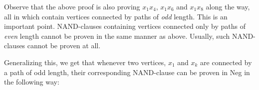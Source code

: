 Observe that the above proof is also proving $x_1x_4$, $x_1x_6$ and $x_1x_8$ along the way, all in which contain vertices connected by paths of \textit{odd} length.
This is an important point.
NAND-clauses containing vertices connected only by paths of \textit{even} length cannot be proven in the same manner as above.
Usually, such NAND-clauses cannot be proven at all.

Generalizing this, we get that whenever two vertices, $x_1$ and $x_k$ are connected by a path of odd length, their corresponding NAND-clause can be proven in Neg in the following way:
\begin{prooftree*}
\end{prooftree*}
